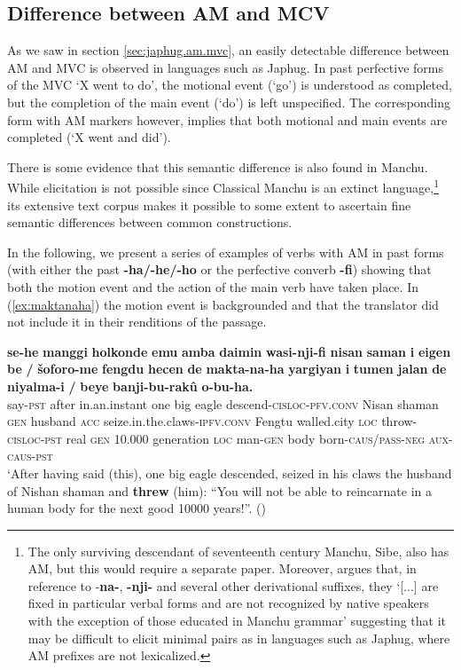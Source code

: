 \documentclass{article}
\newcommand{\ipa}[1]{\textbf{{\phon\mbox{#1}}}} %
\begin{document}
\subsection{Difference between AM and MCV} \label{sec:mvc.manchu}
As we saw in section \ref{sec:japhug.am.mvc}, an easily detectable difference between AM and MVC is observed in languages such as Japhug. In past perfective forms of the MVC ‘X went to do’, the motional event (‘go’) is understood as completed, but the completion of the main event (‘do’) is left unspecified. The corresponding form with AM markers however, implies that both motional and main events are completed (‘X went and did’). 


There is some evidence that this semantic difference is also found in Manchu. While elicitation is not possible since Classical Manchu is an extinct language,\footnote{The only surviving descendant of seventeenth century Manchu, Sibe, also has AM, but this would require a separate paper. Moreover, \citet[178]{zikmundova13sibe} argues that, in reference to -\ipa{na-}, \ipa{-nji-} and several other derivational suffixes, they `[...] are fixed in particular verbal forms and are not recognized by native speakers with the exception of those educated in Manchu grammar' suggesting that it may be difficult to elicit minimal pairs as in languages such as Japhug, where AM prefixes are not lexicalized. } its extensive text corpus makes it possible to some extent to ascertain fine semantic differences between common constructions.

In the following, we present a series of examples of verbs with AM in past forms (with either the past \ipa{-ha/-he/-ho} or the perfective converb \ipa{-fi}) showing that both the motion event and the action of the main verb have taken place. In (\ref{ex:maktanaha}) the motion event is backgrounded and that the translator did not include it in their renditions of the passage.

\begin{exe}
\ex  \label{ex:maktanaha}
\gll
\ipa{se-he} 	\ipa{manggi} 	\ipa{holkonde} 	\ipa{emu} 	\ipa{amba} 	\ipa{daimin} 	\ipa{wasi-nji-fi} 	\ipa{nisan} 	\ipa{saman} 	\ipa{i} 	\ipa{eigen} 	\ipa{be} 	\ipa{/} 	\ipa{šoforo-me} 	\ipa{fengdu} 	\ipa{hecen} 	\ipa{de} 	\ipa{makta-na-ha} 	\ipa{yargiyan} 	\ipa{i} 	\ipa{tumen} 	\ipa{jalan} 	\ipa{de} 	\ipa{niyalma-i} 	\ipa{/} 	\ipa{beye} 	\ipa{banji-bu-rakû} 	\ipa{o-bu-ha.} \\
say-\textsc{pst} after in.an.instant one big eagle descend-\textsc{cisloc}-\textsc{pfv.conv} Nisan shaman \textsc{gen} husband \textsc{acc} { } seize.in.the.claws-\textsc{ipfv.conv} Fengtu walled.city \textsc{loc} throw-\textsc{cisloc-pst} real \textsc{gen} 10.000 generation \textsc{loc} man-\textsc{gen} { } body born-\textsc{caus/pass-neg} \textsc{aux-caus-pst} \\
\glt `After having said (this), one big eagle descended, seized in his claws the husband of Nishan shaman and \textbf{threw} (him): “You will not be able to reincarnate in a human body for the next good 10000 years!”. (\citealt[85,20b/119]{jaxontov93nisan})
\end{exe}
\end{document}
